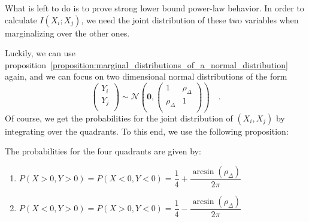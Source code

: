 \documentclass[../../main.tex]{subfiles}
\begin{document}
\bigskip
What is left to do is to prove strong lower bound power-law behavior. In order to calculate $I(X_i; X_j)$, we need the joint distribution of these two variables when marginalizing over the other ones.

Luckily, we can use proposition~\ref{proposition:marginal_distributions_of_a_normal_distribution} again, and we can focus on two dimensional normal distributions of the form
\[
    \begin{pmatrix*}
        Y_i \\
        Y_j \\
    \end{pmatrix*}
    \sim \mathcal{N}\left(\bm{0}, \begin{pmatrix*}
        1 & \rho_\Delta \\
        \rho_\Delta & 1 \\
    \end{pmatrix*}\right)
    \quad .
\]
Of course, we get the probabilities for the joint distribution of $(X_i, X_j)$ by integrating over the quadrants. To this end, we use the following proposition:

\begin{proposition}
The probabilities for the four quadrants are given by:
\begin{enumerate}
    \item $P(X > 0, Y > 0) = P(X < 0, Y < 0) = \dfrac{1}{4} + \dfrac{\arcsin(\rho_\Delta)}{2\pi}$
    \item $P(X < 0, Y > 0) = P(X > 0, Y < 0) = \dfrac{1}{4} - \dfrac{\arcsin(\rho_\Delta)}{2\pi}$
\end{enumerate}
\end{proposition}
\end{document}
